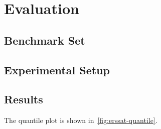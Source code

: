 \section{Evaluation}
\label{sect:erssat-evaluation}

\subsection{Benchmark Set}

\subsection{Experimental Setup}

\subsection{Results}

\begin{figure*}[t]
    \centering
    
    \caption{The quantile plot of application formulas}
    \label{fig:erssat-quantile}
\end{figure*}

The quantile plot is shown in~\cref{fig:erssat-quantile}.